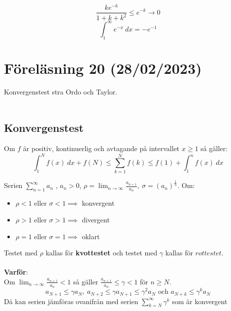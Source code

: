 \documentclass{report}
\begin{document}
\sol 
\begin{equation*}
	\frac{ke^{-k}}{1+k+k^2} \le e^{-k} \to 0
\end{equation*}
\begin{equation*}
	\int_{1}^{ \infty} e^{-x} \: dx = -e^{-1}
\end{equation*}

\section{Föreläsning 20 (28/02/2023)}
Konvergenstest stra Ordo och Taylor.\\\\

\subsection{Konvergenstest}

{
Om $ f $ är positiv, kontinuerlig och avtagande på intervallet $ x \ge 1 $ så gäller:
\begin{equation*}
\int_{1}^{N} f(x) \: dx + f(N) \le \sum_{k = 1}^{N} f(k) \le f(1) + \int_{1}^{n} f(x) \: dx 
\end{equation*}
}

{
	Serien $ \sum_{n = 1}^{ \infty} a_n $ , $ a_n > 0 $, $ \rho = \lim_{n \to \infty} \frac{a_{n+1}}{a_n},\:\sigma = (a_n)^{ \frac{1}{n}  } $. Om:
\begin{itemize}
	\item $ \rho < 1 \text{ eller } \sigma < 1 \implies $ konvergent
	\item $ \rho > 1 \text{ eller } \sigma > 1  \implies  $ divergent
	\item $ \rho = 1 \text{ eller } \sigma = 1 \implies $ oklart
\end{itemize}
Testet med $ \rho $ kallas för \textbf{kvottestet} och testet med $ \gamma $ kallas för $ rottestet $.\\\\

\textbf{Varför}:\\
Om $ \lim_{n \to \infty} \frac{a_{n+1}}{a_n} < 1  $ så gäller $ \frac{a_{n+1}}{a_n} \le \gamma < 1 $ för $ n \ge N $.
\begin{equation*}
	a_{N+1} \le \gamma a_N,\: a_{N+2} \le \gamma a_{N+1} \le \gamma^2 a_N \text{ och } a_{N+k} \le \gamma^k a_N
\end{equation*}
Då kan serien jämföras ovanifrån med serien $ \sum_{k = N}^{ \infty } \gamma ^k $ som är konvergent
}
\end{document}
